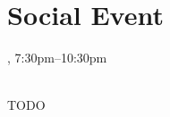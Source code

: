 \clearpage
\section{Social Event}
\setheaders{}{\daydateyear}

\begin{center}



\daydateyear, 7:30pm--10:30pm \vspace{1em}\\
\SocialLoc\\
\end{center}

TODO 
